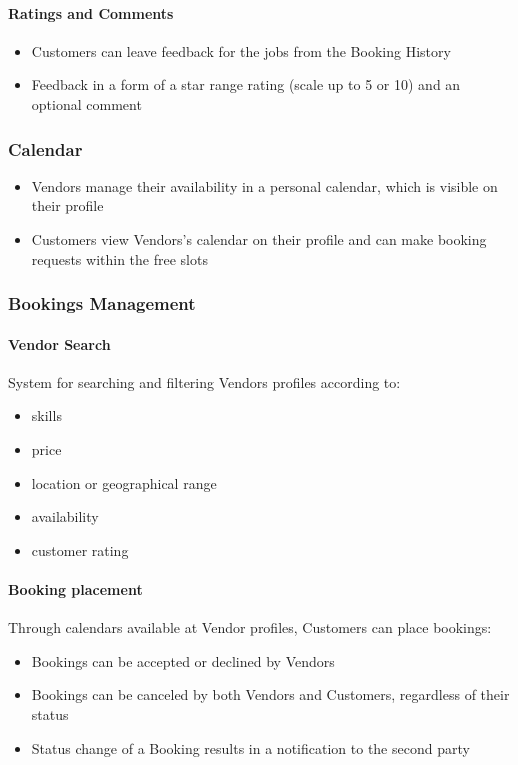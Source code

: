 \documentclass[11pt,a4paper]{article}
\begin{document}
\paragraph{Ratings and Comments}
\begin{itemize}
  \item Customers can leave feedback for the jobs from the Booking History
  \item Feedback in a form of a star range rating (scale up to 5 or
    10) and an optional comment
\end{itemize}

\subsubsection{Calendar}
\begin{itemize}
  \item Vendors manage their availability in a personal calendar,
    which is visible on their profile
  \item Customers view Vendors's calendar on their profile and can
    make booking requests within the free slots
\end{itemize}

\subsubsection{Bookings Management}

\paragraph{Vendor Search}

System for searching and filtering Vendors profiles according to:
\begin{itemize}
  \item skills
  \item price
  \item location or geographical range
  \item availability
  \item customer rating
\end{itemize}

\paragraph{Booking placement}

Through calendars available at Vendor profiles, Customers can place bookings:
\begin{itemize}
  \item Bookings can be accepted or declined by Vendors
  \item Bookings can be canceled by both Vendors and Customers,
    regardless of their status
  \item Status change of a Booking results in a notification to the second party
\end{itemize}
\end{document}
